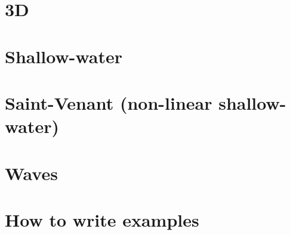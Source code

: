\documentclass[a4paper]{article}
\begin{document}







\section{3D}




\section{Shallow-water}



\section{Saint-Venant (non-linear shallow-water)}




\section{Waves}



\section{\label{howto}How to write examples}
\end{document}
